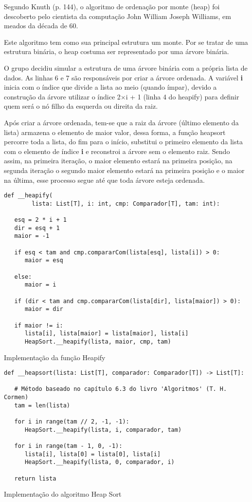 \documentclass[a4paper,12pt]{scrartcl}
\begin{document}
Segundo Knuth (p. 144), o algoritmo de ordenação por monte (heap) foi descoberto pelo cientista da computação John William Joseph Williams, em meados da década de 60.

Este algoritmo tem como sua principal estrutura um monte. Por se tratar de uma estrutura binária, o heap costuma ser representado por uma árvore binária.

O grupo decidiu simular a estrutura de uma árvore binária com a própria lista de dados. As linhas 6 e 7 são responsáveis por criar a árvore ordenada. A variável \textbf{i} inicia com o índice que divide a lista ao meio (quando ímpar), devido a construção da árvore utilizar o índice 2$\times{}$i + 1 (linha 4 do heapify) para definir quem será o nó filho da esquerda ou direita da raiz. 

Após criar a árvore ordenada, tem-se que a raiz da árvore (último elemento da lista) armazena o elemento de maior valor, dessa forma, a função heapsort percorre toda a lista, do fim para o início, substitui o primeiro elemento da lista com o elemento de índice \textbf{i} e reconstroi a árvore sem o elemento raiz. Sendo assim, na primeira iteração, o maior elemento estará na primeira posição, na segunda iteração o segundo maior elemento estará na primeira posição e o maior na última, esse processo segue até que toda árvore esteja ordenada.

\begin{listing}[H]
\begin{verbatim}
def __heapify(
        lista: List[T], i: int, cmp: Comparador[T], tam: int):

   esq = 2 * i + 1
   dir = esq + 1
   maior = -1

   if esq < tam and cmp.compararCom(lista[esq], lista[i]) > 0:
      maior = esq

   else:
      maior = i

   if (dir < tam and cmp.compararCom(lista[dir], lista[maior]) > 0):
      maior = dir

   if maior != i:
      lista[i], lista[maior] = lista[maior], lista[i]
      HeapSort.__heapify(lista, maior, cmp, tam)

\end{verbatim}
\caption{\footnotesize{Implementação da função Heapify}}
\end{listing}

\begin{listing}[H]
\begin{verbatim}
def __heapsort(lista: List[T], comparador: Comparador[T]) -> List[T]:

   # Método baseado no capítulo 6.3 do livro 'Algoritmos' (T. H. Cormen)
   tam = len(lista)

   for i in range(tam // 2, -1, -1):
      HeapSort.__heapify(lista, i, comparador, tam)

   for i in range(tam - 1, 0, -1):
      lista[i], lista[0] = lista[0], lista[i]
      HeapSort.__heapify(lista, 0, comparador, i)

   return lista
\end{verbatim}
\caption{\footnotesize{Implementação do algoritmo Heap Sort}}
\end{listing}
\end{document}
